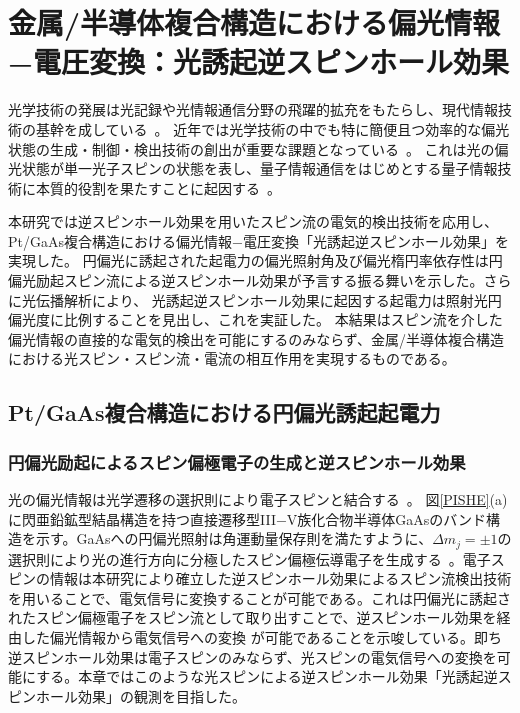 \chapter{金属/半導体複合構造における偏光情報−電圧変換：光誘起逆スピンホール効果}


光学技術の発展は光記録や光情報通信分野の飛躍的拡充をもたらし、現代情報技術の基幹を成している~\cite{Gupta}。
近年では光学技術の中でも特に簡便且つ効率的な偏光状態の生成・制御・検出技術の創出が重要な課題となっている~\cite{Lindfors,jeong,Schubert,lai}。
これは光の偏光状態が単一光子スピンの状態を表し、量子情報通信をはじめとする量子情報技術に本質的役割を果たすことに起因する~\cite{citeulike:541803,Bouwmeester}。

本研究では逆スピンホール効果を用いたスピン流の電気的検出技術を応用し、Pt/GaAs複合構造における偏光情報−電圧変換「光誘起逆スピンホール効果」を実現した。
円偏光に誘起された起電力の偏光照射角及び偏光楕円率依存性は円偏光励起スピン流による逆スピンホール効果が予言する振る舞いを示した。さらに光伝播解析により、
光誘起逆スピンホール効果に起因する起電力は照射光円偏光度に比例することを見出し、これを実証した。
本結果はスピン流を介した偏光情報の直接的な電気的検出を可能にするのみならず、金属/半導体複合構造における光スピン・スピン流・電流の相互作用を実現するものである。


\section{Pt/GaAs複合構造における円偏光誘起起電力}

\subsection{円偏光励起によるスピン偏極電子の生成と逆スピンホール効果}

光の偏光情報は光学遷移の選択則により電子スピンと結合する~\cite{Pierce,Meier}。
図\ref{PISHE}(a)に閃亜鉛鉱型結晶構造を持つ直接遷移型I\hspace{-.1em}I\hspace{-.1em}I$-$V族化合物半導体GaAsのバンド構造を示す。GaAsへの円偏光照射は角運動量保存則を満たすように、$\Delta m_j=\pm 1$の選択則により光の進行方向に分極したスピン偏極伝導電子を生成する~\cite{Pierce,Meier}。電子スピンの情報は本研究により確立した逆スピンホール効果によるスピン流検出技術を用いることで、電気信号に変換することが可能である。これは円偏光に誘起されたスピン偏極電子をスピン流として取り出すことで、逆スピンホール効果を経由した偏光情報から電気信号への変換
が可能であることを示唆している。即ち逆スピンホール効果は電子スピンのみならず、光スピンの電気信号への変換を可能にする。本章ではこのような光スピンによる逆スピンホール効果「光誘起逆スピンホール効果」の観測を目指した。





